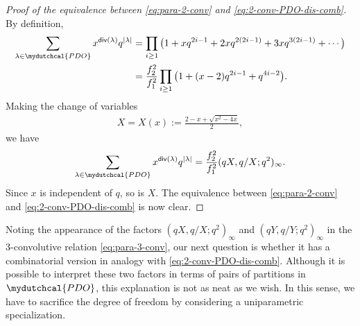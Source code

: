 \documentclass[12pt,reqno]{amsart}
\numberwithin{equation}{section}
\theoremstyle{plain}
\theoremstyle{definition}
\theoremstyle{named}
\newcommand{\cPDO}{\mydutchcal{PDO}}
\newcommand{\dis}{\mathsf{div}}
\begin{document}
\begin{proof}[Proof of the equivalence between \eqref{eq:para-2-conv} and \eqref{eq:2-conv-PDO-dis-comb}]
	By definition,
	\begin{align*}
		\sum_{\lambda\in \cPDO} x^{\dis(\lambda)} q^{|\lambda|} &= \prod_{i\ge 1} \big(1+xq^{2i-1}+2xq^{2(2i-1)}+3xq^{3(2i-1)}+\cdots\big)\\
		&= \frac{f_2^2}{f_1^2} \prod_{i\ge 1} \big(1+(x-2)q^{2i-1}+q^{4i-2}\big).
	\end{align*}
	Making the change of variables
	\begin{align}\label{eq:x-X}
		X = X(x):= \frac{2-x+\sqrt{x^2-4x}}{2},
	\end{align}
	we have
	\begin{align}
		\sum_{\lambda\in \cPDO} x^{\dis(\lambda)} q^{|\lambda|} = \frac{f_2^2}{f_1^2} (qX,q/X;q^2)_\infty.
	\end{align}
	Since $x$ is independent of $q$, so is $X$. The equivalence between \eqref{eq:para-2-conv} and \eqref{eq:2-conv-PDO-dis-comb} is now clear.
\end{proof}

Noting the appearance of the factors $(qX,q/X;q^2)_\infty$ and $(qY,q/Y;q^2)_\infty$ in the $3$-convolutive relation \eqref{eq:para-3-conv}, our next question is whether it has a combinatorial version in analogy with \eqref{eq:2-conv-PDO-dis-comb}. Although it is possible to interpret these two factors in terms of pairs of partitions in $\cPDO$, this explanation is not as neat as we wish. In this sense, we have to sacrifice the degree of freedom by considering a uniparametric specialization.
\end{document}
